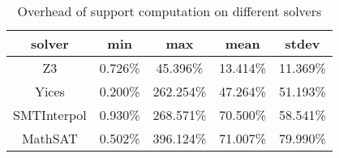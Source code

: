 \begin{table}
  \centering
  \begin{tabular}{ |c||c|c|c|c| }
    \hline
     solver & min & max & mean & stdev \\[0.5ex]
    \hline
    Z3   & 0.726\% & 45.396\% & 13.414\% & 11.369\% \\[0.5ex]
    Yices &   0.200\%  & 262.254\%   & 47.264\% & 51.193\% \\[0.5ex]
    SMTInterpol& 0.930\% & 268.571\% &  70.500\% & 58.541\%\\[0.5ex]
    MathSAT & 0.502\% & 396.124\% &  71.007\% & 79.990\%\\[0.5ex]
    \hline
  \end{tabular}
  \caption{\small{Overhead of support computation on different solvers}}
  \label{tab:overhead}
\end{table}

\vspace{6pt}
\noindent{}
 \vspace{9pt}

